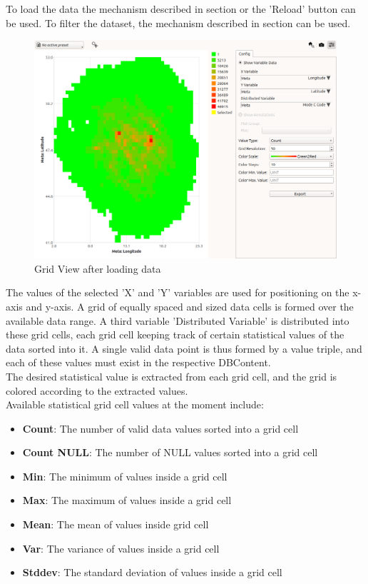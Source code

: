 To load the data the mechanism described in section  or the 'Reload' button can be used. To filter the dataset, the mechanism described in section  can be used. \\

\begin{figure}[H]
    \hspace*{-2cm}
    \includegraphics[width=18cm,frame]{figures/grid_loaded.png}
  \caption{Grid View after loading data}
\end{figure}

The values of the selected 'X' and 'Y' variables are used for positioning on the x-axis and y-axis.
A grid of equally spaced and sized data cells is formed over the available data range.
A third variable 'Distributed Variable' is distributed into these grid cells, each grid cell
keeping track of certain statistical values of the data sorted into it.
A single valid data point is thus formed by a value triple, and each of these values must exist in the respective DBContent. \\

The desired statistical value is extracted from each grid cell, and the grid is colored according to the extracted values. \\

Available statistical grid cell values at the moment include:

\begin{itemize}
    \item \textbf{Count}: The number of valid data values sorted into a grid cell
    \item \textbf{Count NULL}: The number of NULL values sorted into a grid cell
    \item \textbf{Min}: The minimum of values inside a grid cell
    \item \textbf{Max}: The maximum of values inside a grid cell
    \item \textbf{Mean}: The mean of values inside grid cell
    \item \textbf{Var}: The variance of values inside a grid cell
    \item \textbf{Stddev}: The standard deviation of values inside a grid cell
\end{itemize}
\ \\

